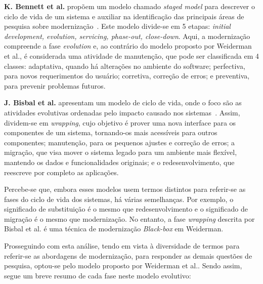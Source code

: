 \textbf{K. Bennett et al.} propõem um modelo chamado 
\textit{staged model} para descrever o ciclo de vida de um sistema e auxiliar na identificação das principais 
áreas de pesquisa sobre modernização~\cite{S01_bennett2000software}. Este modelo divide-se em 5 etapas: 
\textit{initial development, evolution, servicing, phase-out, close-down}. Aqui, a modernização compreende a fase \textit{evolution} e, 
ao contrário do modelo proposto por Weiderman et al., é considerada uma atividade de manutenção, que pode ser classificada em 
4 classes: adaptativa, quando há alterações no ambiente do software; perfectiva, para novos requerimentos do usuário; corretiva, correção de erros; e preventiva, para 
prevenir problemas futuros. 

\textbf{J. Bisbal et al.} apresentam um modelo de ciclo de vida, onde o foco são as atividades evolutivas ordenadas pelo impacto causado nos 
sistemas~\cite{S3_Bisbal:1999}. Assim, dividem-se em \textit{wrapping}, cujo objetivo é prover uma nova interface para os componentes de um sistema, 
tornando-os mais acessíveis para outros componentes; manutenção, para os pequenos ajustes e correção de erros; a migração, que visa mover o sistema 
legado para um ambiente mais flexível, mantendo os dados e funcionalidades originais; e o redesenvolvimento, que reescreve por completo as aplicações. 

Percebe-se que, embora esses modelos usem termos distintos para referir-se as fases do ciclo de vida dos sistemas, há várias semelhanças. Por exemplo, 
o significado de substituição é o mesmo que redesenvolvimento e o significado de migração é o mesmo que modernização. No entanto, 
a fase \textit{wrapping} descrita por Bisbal et al. é uma técnica de modernização \textit{Black-box} em Weiderman.

Prosseguindo com esta análise, tendo em vista à diversidade de termos para referir-se as abordagens de modernização, 
para responder as demais questões de pesquisa, optou-se pelo modelo proposto por Weiderman et al.. Sendo assim, segue um breve resumo de cada 
fase neste modelo evolutivo:

